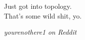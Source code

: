 
\chapter{}

\epigraph{Just got into topology. \\ That's some wild shit, yo.}{\textit{yourenothere1 on Reddit}}

